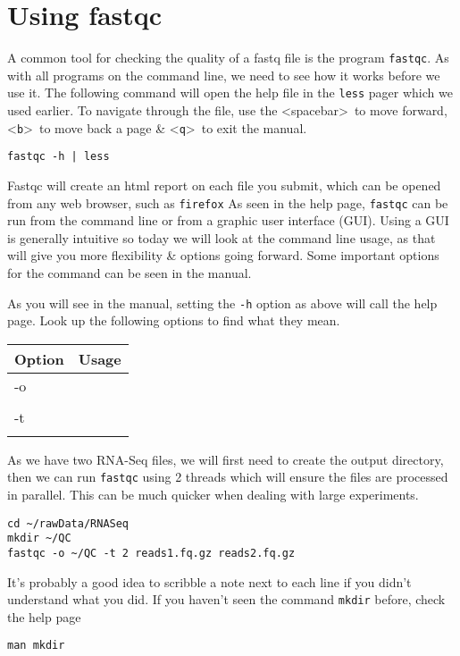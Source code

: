 \section{Using fastqc}
\begin{steps}
A common tool for checking the quality of a fastq file is the program \texttt{fastqc}.
As with all programs on the command line, we need to see how it works before we use it.
The following command will open the help file in the \texttt{less} pager which we used earlier.
To navigate through the file, use the \textless spacebar\textgreater ~to move forward, \textless \texttt{b}\textgreater ~to move back a page \& \textless \texttt{q}\textgreater ~to exit the manual. \\
\begin{lstlisting}
fastqc -h | less
\end{lstlisting}
\end{steps}

\begin{note}
Fastqc will create an html report on each file you submit, which can be opened from any web browser, such as \texttt{firefox}
As seen in the help page, \texttt{fastqc} can be run from the command line or from a graphic user interface (GUI).
Using a GUI is generally intuitive so today we will look at the command line usage, as that will give you more flexibility \& options
going forward.
Some important options for the command can be seen in the manual.\\
\end{note}
\begin{steps}
As you will see in the manual, setting the \texttt{-h} option as above will call the help page.
Look up the following options to find what they mean. \\
\begin{center}
\begin{tabular}[h]{|p{4cm}|p{8cm}|}
  \hline
  \textbf{Option} & \textbf{Usage} \\
  \hline
  -o & \\
   & \\
   \hline
  -t & \\
   & \\
  \hline
\end{tabular}
\end{center}
\end{steps}

\begin{steps}
As we have two RNA-Seq files, we will first need to create the output directory, then we can run \texttt{fastqc} using 2 threads which will ensure the files are processed in parallel.
This can be much quicker when dealing with large experiments.
\begin{lstlisting}
cd ~/rawData/RNASeq
mkdir ~/QC
fastqc -o ~/QC -t 2 reads1.fq.gz reads2.fq.gz
\end{lstlisting}
It's probably a good idea to scribble a note next to each line if you didn't understand what you did.
If you haven't seen the command \texttt{mkdir} before, check the help page 
\begin{lstlisting}
man mkdir
\end{lstlisting}
\end{steps}


